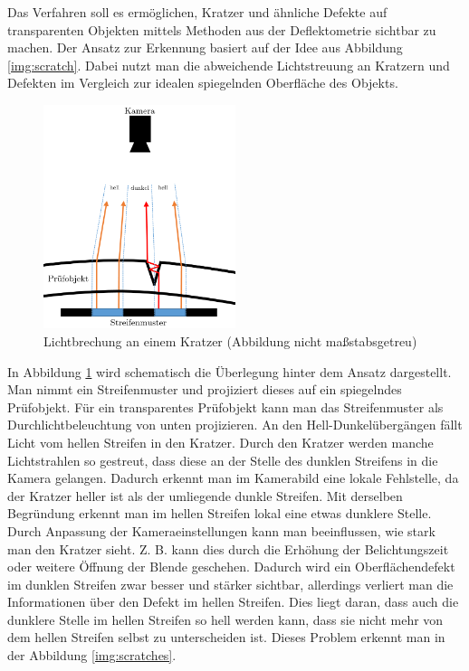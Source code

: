 Das Verfahren soll es ermöglichen, Kratzer und ähnliche Defekte auf transparenten Objekten mittels Methoden aus der Deflektometrie sichtbar zu machen.
Der Ansatz zur Erkennung basiert auf der Idee aus Abbildung \ref{img:scratch}.
Dabei nutzt man die abweichende Lichtstreuung an Kratzern und Defekten im Vergleich zur idealen spiegelnden Oberfläche des Objekts.

\begin{figure}[H]
	\centering
	\includegraphics[width=0.5\textwidth]{03_sichtpruefungDurchLichtstreuung/verfahren/figures/scratch_reflection}
	\caption[Lichtbrechung an einem Kratzer]{Lichtbrechung an einem Kratzer (Abbildung nicht maßstabsgetreu)}
	\label{img:lightreflection}
\end{figure}

\noindent
In Abbildung \ref{img:lightreflection} wird schematisch die Überlegung hinter dem Ansatz dargestellt.
Man nimmt ein Streifenmuster und projiziert dieses auf ein spiegelndes Prüfobjekt.
Für ein transparentes Prüfobjekt kann man das Streifenmuster als Durchlichtbeleuchtung von unten projizieren.
An den Hell-Dunkelübergän\-gen fällt Licht vom hellen Streifen in den Kratzer.
Durch den Kratzer werden manche Lichtstrahlen so gestreut, dass diese an der Stelle des dunklen Streifens in die Kamera gelangen.
Dadurch erkennt man im Kamerabild eine lokale Fehlstelle, da der Kratzer heller ist als der umliegende dunkle Streifen.
Mit derselben Begründung erkennt man im hellen Streifen lokal eine etwas dunklere Stelle.
Durch Anpassung der Kameraeinstellungen kann man beeinflussen, wie stark man den Kratzer sieht.
Z. B. kann dies durch die Erhöhung der Belichtungszeit oder weitere Öffnung der Blende geschehen.
Dadurch wird ein Oberflächendefekt im dunklen Streifen zwar besser und stärker sichtbar, allerdings verliert man die Informationen über den Defekt im hellen Streifen.
Dies liegt daran, dass auch die dunklere Stelle im hellen Streifen so hell werden kann, dass sie nicht mehr von dem hellen Streifen selbst zu unterscheiden ist.
Dieses Problem erkennt man in der Abbildung \ref{img:scratches}.

